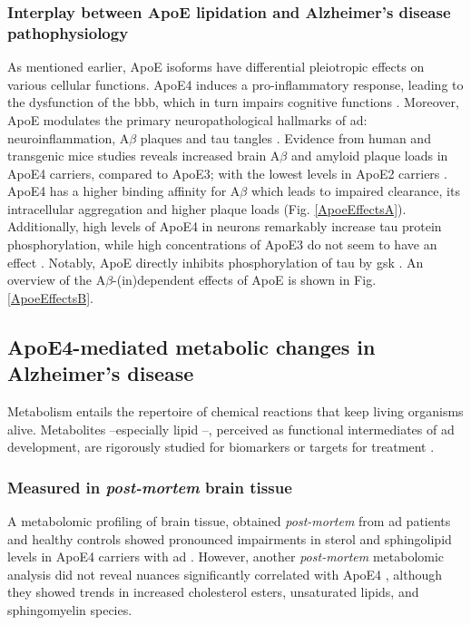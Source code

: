 \documentclass{amsart}
\begin{document}
\subsubsection*{Interplay between ApoE lipidation and Alzheimer's disease pathophysiology}\label{ApoEAD}
As mentioned earlier, ApoE isoforms have differential pleiotropic effects on various cellular functions. ApoE4 induces a pro-inflammatory response, leading to the dysfunction of the \acrlong{bbb}, which in turn impairs cognitive functions \cite{Marottoli2017PeripheralDysfunction, Teng2017ApoEInjury, Kloske2020TheDisease}. Moreover, ApoE modulates the primary neuropathological hallmarks of \acrshort{ad}: neuroinflammation, A$\beta$ plaques and tau tangles \cite{Husain2021APOETherapeutics}. Evidence from human and transgenic mice studies reveals increased brain A$\beta$ and amyloid plaque loads in ApoE4 carriers, compared to ApoE3; with the lowest levels in ApoE2 carriers \cite{Huang2017ApoE2Secretion, Tachibana2016RescuingLRP1, Safieh2019ApoE4:Disease}. ApoE4 has a higher binding affinity for A$\beta$ which leads to impaired clearance, its intracellular aggregation and higher plaque loads \cite{Kloske2020TheDisease} (Fig. \ref{ApoeEffectsA}). Additionally, high levels of ApoE4 in neurons remarkably increase tau protein phosphorylation, while high concentrations of ApoE3 do not seem to have an effect \cite{Cao2017ApoE4-associatedInjury, Shi2017ApoE4Tauopathy, Vasilevskaya2020InteractionAthletes, Wang2018GainCorrector}. Notably,  ApoE directly inhibits phosphorylation of tau by \acrfull{gsk} \cite{Hoe2006ApolipoproteinNeurons}. An overview of the A$\beta$-(in)dependent effects of ApoE is shown in Fig. \ref{ApoeEffectsB}.

\subsection{ApoE4-mediated metabolic changes in Alzheimer's disease}
Metabolism entails the repertoire of chemical reactions that keep living organisms alive. Metabolites  --especially lipid \cite{Barupal2019SetsPathophysiology,Fernandez-Calle2022APOEDiseases, Proitsi2017AssociationAnalysis}--, perceived as functional intermediates of \acrshort{ad} development, are rigorously studied for biomarkers or targets for treatment \cite{Oeckl2019GlialImpairment}.
 
\subsubsection*{Measured in \textit{post-mortem} brain tissue} A metabolomic profiling of brain tissue, obtained \textit{post-mortem} from \acrshort{ad} patients and healthy controls showed  pronounced impairments in sterol and sphingolipid levels in ApoE4 carriers with \acrshort{ad}  \cite{Bandaru2009ApoE4Brain}. However, another \textit{post-mortem} metabolomic analysis did not reveal nuances significantly correlated with ApoE4 \cite{Novotny2023MetabolomicBrains}, although they showed trends in increased cholesterol esters, unsaturated lipids, and sphingomyelin species.
\end{document}
